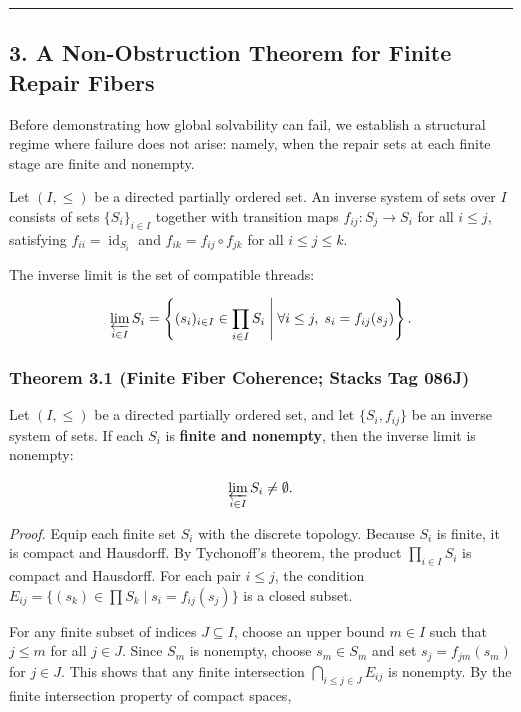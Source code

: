 \documentclass[
  11pt,
]{article}
\theoremstyle{plain}
\theoremstyle{definition}\newtheorem{definition}[theorem]{Definition}
\theoremstyle{remark}\newtheorem*{remark}{Remark}
\begin{document}
\begin{center}\rule{0.5\linewidth}{0.5pt}\end{center}

\subsection{3. A Non-Obstruction Theorem for Finite Repair
Fibers}\label{a-non-obstruction-theorem-for-finite-repair-fibers}

Before demonstrating how global solvability can fail, we establish a
structural regime where failure does not arise: namely, when the repair
sets at each finite stage are finite and nonempty.

Let \((I, \le)\) be a directed partially ordered set. An inverse system
of sets over \(I\) consists of sets \(\{S_i\}_{i \in I}\) together with
transition maps \(f_{ij}: S_j \to S_i\) for all \(i \le j\), satisfying
\(f_{ii} = \operatorname{id}_{S_i}\) and
\(f_{ik} = f_{ij} \circ f_{jk}\) for all \(i \le j \le k\).

The inverse limit is the set of compatible threads:

\[
\varprojlim_{i \in I} S_i = \left\{ (s_i)_{i \in I} \in \prod_{i \in I} S_i \;\middle|\; \forall i \le j,\; s_i = f_{ij}(s_j) \right\}.
\]

\subsubsection{Theorem 3.1 (Finite Fiber Coherence; Stacks Tag
086J)}\label{theorem-3.1-finite-fiber-coherence-stacks-tag-086j}

Let \((I, \le)\) be a directed partially ordered set, and let
\(\{S_i, f_{ij}\}\) be an inverse system of sets. If each \(S_i\) is
\textbf{finite and nonempty}, then the inverse limit is nonempty:

\[
\varprojlim_{i \in I} S_i \neq \emptyset.
\]

\emph{Proof.} Equip each finite set \(S_i\) with the discrete topology.
Because \(S_i\) is finite, it is compact and Hausdorff. By Tychonoff's
theorem, the product \(\prod_{i \in I} S_i\) is compact and Hausdorff.
For each pair \(i \le j\), the condition
\(E_{ij} = \{(s_k) \in \prod S_k \mid s_i = f_{ij}(s_j)\}\) is a closed
subset.

For any finite subset of indices \(J \subseteq I\), choose an upper
bound \(m \in I\) such that \(j \le m\) for all \(j \in J\). Since
\(S_m\) is nonempty, choose \(s_m \in S_m\) and set
\(s_j = f_{jm}(s_m)\) for \(j \in J\). This shows that any finite
intersection \(\bigcap_{i \le j \in J} E_{ij}\) is nonempty. By the
finite intersection property of compact spaces,
\end{document}
